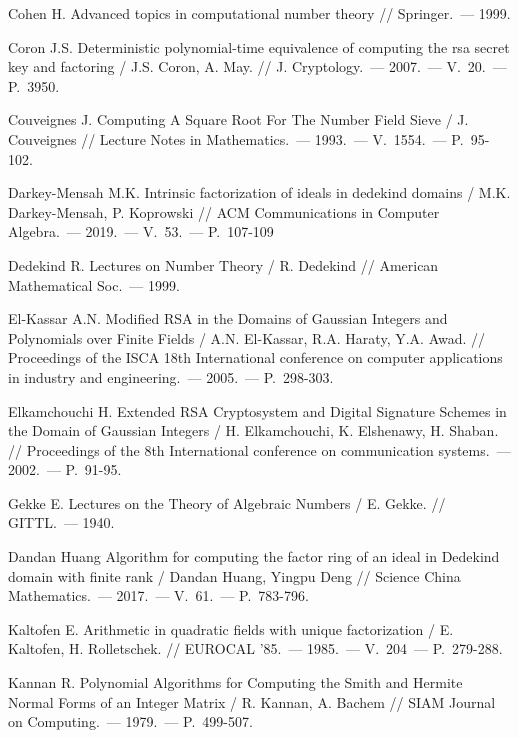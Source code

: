 \begin{thebibliography}{99}
    Cohen H. Advanced topics in computational number theory // Springer.~--- 1999.

    Coron J.S. Deterministic polynomial-time equivalence of computing the rsa secret key and factoring / J.S. Coron, A. May. // J. Cryptology.~--- 2007.~--- V.~20.~--- P.~3950.

    Couveignes J. Computing A Square Root For The Number Field Sieve / J. Couveignes // Lecture Notes in Mathematics.~--- 1993.~--- V.~1554.~--- P.~95-102.

    Darkey-Mensah M.K. Intrinsic factorization of ideals in dedekind domains / M.K. Darkey-Mensah, P. Koprowski // ACM Communications in Computer Algebra.~--- 2019.~--- V.~53.~--- P.~107-109

    Dedekind R. Lectures on Number Theory / R. Dedekind // American Mathematical Soc.~--- 1999.

    El-Kassar A.N. Modified RSA in the Domains of Gaussian Integers and Polynomials over Finite Fields / A.N. El-Kassar, R.A. Haraty, Y.A. Awad. // Proceedings of the ISCA 18th International conference on computer applications in industry and engineering.~--- 2005.~--- P.~298-303.

    Elkamchouchi H. Extended RSA Cryptosystem and Digital Signature Schemes in the Domain of Gaussian Integers / H. Elkamchouchi, K. Elshenawy, H. Shaban. // Proceedings of the 8th International conference on communication systems.~--- 2002.~--- P.~91-95.

    Gekke E. Lectures on the Theory of Algebraic Numbers / E. Gekke. // GITTL.~--- 1940.

    Dandan Huang Algorithm for computing the factor ring of an ideal in Dedekind domain with finite rank / Dandan Huang, Yingpu Deng // Science China Mathematics.~--- 2017.~--- V.~61.~--- P.~783-796.

    Kaltofen E. Arithmetic in quadratic fields with unique factorization / E. Kaltofen, H. Rolletschek. // EUROCAL '85.~--- 1985.~--- V.~204~--- P.~279-288.

    Kannan R. Polynomial Algorithms for Computing the Smith and Hermite Normal Forms of an Integer Matrix / R. Kannan, A. Bachem // SIAM Journal on Computing.~--- 1979.~--- P.~499-507.


\end{thebibliography}
